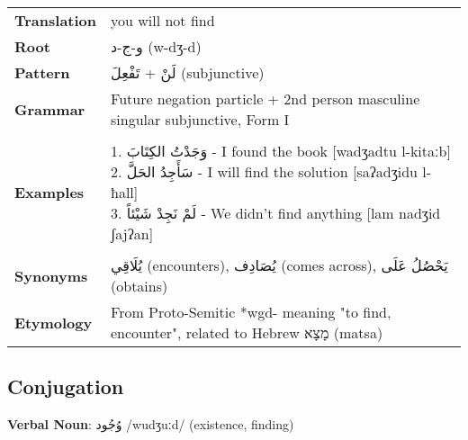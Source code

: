\documentclass[letterpaper,12pt]{article}
\begin{document}
\begin{tabular}{p{3cm}p{10cm}}
\toprule
\textbf{Translation} & you will not find \\
\textbf{Root} & \textarabic{و-ج-د} (w-dʒ-d) \\
\textbf{Pattern} & \textarabic{لَنْ} + \textarabic{تَفْعِلَ} (subjunctive) \\
\textbf{Grammar} & Future negation particle + 2nd person masculine singular subjunctive, Form I \\
\midrule \\
\textbf{Examples} & \makecell[l]{\parbox{9.5cm}{
1. \textarabic{وَجَدْتُ الكِتَابَ} - I found the book [wadʒadtu l-kitaːb]\\
2. \textarabic{سَأَجِدُ الحَلَّ} - I will find the solution [saʔadʒidu l-ħall]\\
3. \textarabic{لَمْ نَجِدْ شَيْئاً} - We didn't find anything [lam nadʒid ʃajʔan]
}} \\
\midrule \\
\textbf{Synonyms} & \textarabic{يُلَاقِي} (encounters), \textarabic{يُصَادِف} (comes across), \textarabic{يَحْصُلُ عَلَى} (obtains) \\
\textbf{Etymology} & From Proto-Semitic *wgd- meaning "to find, encounter", related to Hebrew \texthebrew{מָצָא} (matsa) \\
\bottomrule
\end{tabular}

\subsection{Conjugation}
\par{ \large \textbf{Verbal Noun}: \textarabic{وُجُود} /wudʒuːd/ (existence, finding)}
\end{document}

